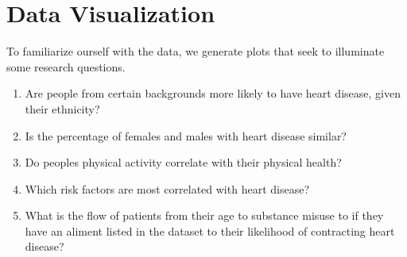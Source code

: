 \documentclass[letterpaper,10pt,english]{jupyterBook}
\begin{document}
\chapter{Data Visualization}
\label{\detokenize{Initial_Data_Exploration:data-visualization}}
\sphinxAtStartPar
To familiarize ourself with the data, we generate plots that seek to illuminate some research questions.
\begin{enumerate}
%
\item {} 
\sphinxAtStartPar
Are people from certain backgrounds more likely to have heart disease, given their ethnicity?

\item {} 
\sphinxAtStartPar
Is the percentage of females and males with heart disease similar?

\item {} 
\sphinxAtStartPar
Do peoples  physical activity correlate with their physical health?

\item {} 
\sphinxAtStartPar
Which risk factors are most correlated with heart disease?

\item {} 
\sphinxAtStartPar
What is the flow of patients from  their age to substance misuse to if they have an aliment listed in the dataset to  their likelihood of contracting heart disease?

\end{enumerate}
\end{document}
